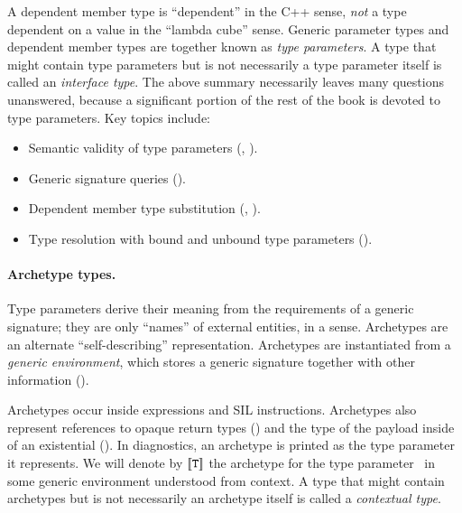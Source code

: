 \documentclass[../generics]{subfiles}
\begin{document}
A dependent member type is ``dependent'' in the C++ sense, \emph{not} a type  dependent on a value in the ``lambda cube'' sense. Generic parameter types and dependent member types are together known as \emph{type parameters}. A type that might contain type parameters but is not necessarily a type parameter itself is called an \emph{interface type}. The above summary necessarily leaves many questions unanswered, because a significant portion of the rest of the book is devoted to type parameters. Key topics include:
\begin{itemize}
\item Semantic validity of type parameters (, ).
\item Generic signature queries ().
\item Dependent member type substitution (, ).
\item Type resolution with bound and unbound type parameters ().
\end{itemize}

\paragraph{Archetype types.}
Type parameters derive their meaning from the requirements of a generic signature; they are only ``names'' of external entities, in a sense. Archetypes are an alternate ``self-describing'' representation. Archetypes are instantiated from a \emph{generic environment}, which stores a generic signature together with other information ().

Archetypes occur inside expressions and SIL instructions. Archetypes also represent references to opaque return types () and the type of the payload inside of an existential (). In diagnostics, an archetype is printed as the type parameter it represents. We will denote by $[\![\texttt{T}]\!]$ the archetype for the type parameter \tT\ in some generic environment understood from context. A type that might contain archetypes but is not necessarily an archetype itself is called a \emph{contextual type}.

\medskip
\end{document}
